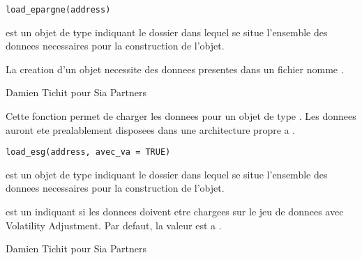 \documentclass[a4paper]{book}
\begin{document}
%
\begin{Usage}
\begin{verbatim}
load_epargne(address)
\end{verbatim}
\end{Usage}
%
\begin{Arguments}
\begin{ldescription}
\item[\code{address}] est un objet de type  indiquant le dossier dans lequel se situe l'ensemble des donnees necessaires
pour la construction de l'objet.
\end{ldescription}
\end{Arguments}
%
\begin{Details}\relax
La creation d'un objet  necessite des donnees presentes dans un fichier nomme .
\end{Details}
%
\begin{Author}\relax
Damien Tichit pour Sia Partners
\end{Author}
%
\begin{Description}\relax
Cette fonction permet de charger les donnees pour un objet de type . Les donnees auront ete prealablement disposees dans
une architecture propre a .
\end{Description}
%
\begin{Usage}
\begin{verbatim}
load_esg(address, avec_va = TRUE)
\end{verbatim}
\end{Usage}
%
\begin{Arguments}
\begin{ldescription}
\item[\code{address}] est un objet de type  indiquant le dossier dans lequel se situe l'ensemble des donnees necessaires
pour la construction de l'objet.

\item[\code{avec\_va}] est un  indiquant si les donnees doivent etre chargees sur le jeu de donnees avec Volatility Adjustment. Par defaut, la valeur est a .
\end{ldescription}
\end{Arguments}
%
\begin{Author}\relax
Damien Tichit pour Sia Partners
\end{Author}
\end{document}
